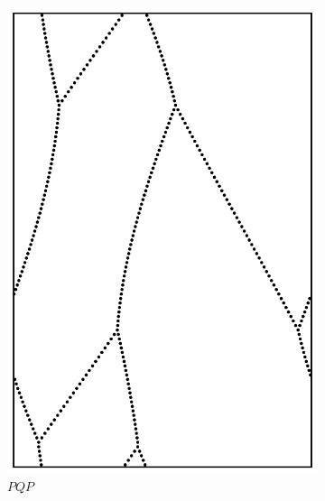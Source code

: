 \documentclass[12pt,twoside]{reedthesis}
\theoremstyle{definition}
\begin{document}
\begin{figure}[b!]
\begin{subfigure}[t]{0.24\textwidth}
    \includegraphics[width=\textwidth]{figures/string_cheese_appendix/pqp.pdf}
    \caption*{$PQP$}
    \vspace{5mm}
  \end{subfigure}
  \hfill
  \begin{subfigure}[t]{0.24\textwidth}

\end{subfigure}
\end{figure}
\end{document}
